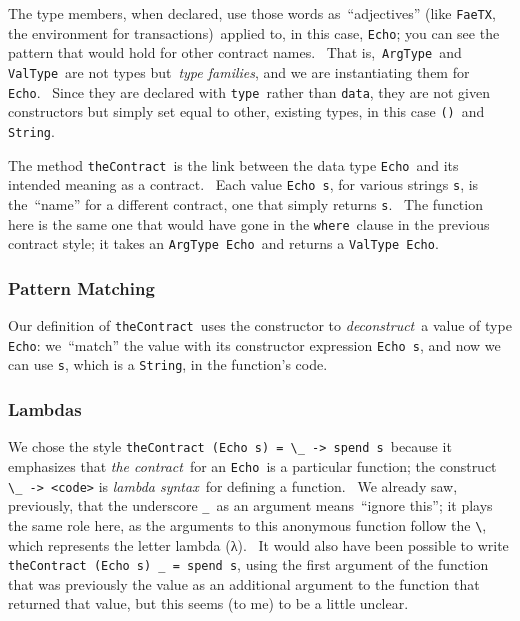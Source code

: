 \documentclass[11pt]{article}
\begin{document}

\vspace{11pt}

The type members, when declared, use those words as “adjectives” (like \texttt{FaeTX}, the environment for transactions) applied to, in this case, \texttt{Echo}; you can see the pattern that would hold for other contract names.  That is, \texttt{ArgType} and \texttt{ValType} are not types but \textit{type families}, and we are instantiating them for \texttt{Echo}.  Since they are declared with \texttt{type} rather than \texttt{data}, they are not given constructors but simply set equal to other, existing types, in this case \texttt{()} and \texttt{String}.\texttt{ }


\vspace{11pt}

The method \texttt{theContract} is the link between the data type \texttt{Echo} and its intended meaning as a contract.  Each value \texttt{Echo s}, for various strings \texttt{s}, is the “name” for a different contract, one that simply returns \texttt{s}.  The function here is the same one that would have gone in the \texttt{where} clause in the previous contract style; it takes an \texttt{ArgType Echo} and returns a \texttt{ValType Echo}.

\subsubsection{Pattern Matching}
\vspace{5.5pt}

Our definition of \texttt{theContract} uses the constructor to \textit{deconstruct} a value of type \texttt{Echo}: we “match” the value with its constructor expression \texttt{Echo s}, and now we can use \texttt{s}, which is a \texttt{String}, in the function's code.

\subsubsection{Lambdas}
\vspace{5.5pt}

We chose the style \texttt{theContract (Echo s) = \textbackslash{}\_ -}\texttt{\textgreater{}}\texttt{ spend s} because it emphasizes that \textit{the contract} for an \texttt{Echo} is a particular function; the construct \texttt{\textbackslash{}\_ -}\texttt{\textgreater{}}\texttt{ }\texttt{\textless{}}\texttt{code}\texttt{\textgreater{}}\textit{ }is \textit{lambda syntax} for defining a function.  We already saw, previously, that the underscore \texttt{\_} as an argument means “ignore this”; it plays the same role here, as the arguments to this anonymous function follow the \texttt{\textbackslash{}}, which represents the letter lambda ({\fbf λ}).  It would also have been possible to write \texttt{theContract (Echo s) \_ = spend s}, using the first argument of the function that was previously the value as an additional argument to the function that returned that value, but this seems (to me) to be a little unclear.
\end{document}
